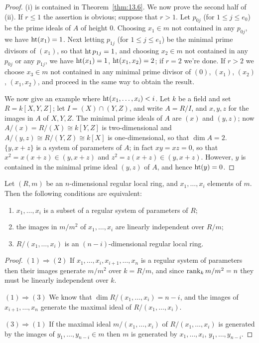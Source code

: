 \begin{proof}
(i) is contained in Theorem~\ref{thm:13.6}. We now prove the second half of
(ii). If $r \le 1$ the assertion is obvious; suppose that $r > 1$. Let $p_{0j}$ (for $1 \le
j \le e_0$) be the prime ideals of $A$ of height $0$. Choosing $x_1 \in m$ not contained
in any $p_{0j}$, we have $\operatorname{ht} (x_1) = 1$. Next letting $p_{1j}$ (for $1 \le j \le e_1$) be the minimal
prime divisors of $(x_1)$, so that $\operatorname{ht} p_{1j} = 1$, and choosing $x_2 \in m$ not contained
in any $p_{0j}$ or any $p_{1j}$, we have $\operatorname{ht}(x_1) = 1$, $\operatorname{ht}(x_1, x_2) = 2$; if $r = 2$ we're
done. If $r > 2$ we choose $x_3 \in m$ not contained in any minimal prime
divisor of $(0)$, $(x_1)$, $(x_2)$, $(x_1, x_2)$, and proceed in the same way to obtain
the result.

We now give an example where $\operatorname{ht} (x_1, \ldots, x_i) < i$. Let $k$ be a field and
set $R = k[X, Y, Z]$; let $I = (X) \cap (Y, Z)$, and write $A = R/I$, and $x, y, z$ for
the images in $A$ of $X, Y, Z$. The minimal prime ideals of $A$ are $(x)$ and
$(y, z)$; now $A/(x) = R/(X) \cong k[Y, Z]$ is two-dimensional and $A/(y, z) \cong
R/(Y, Z) \cong k[X]$ is one-dimensional, so that $\dim A = 2$. $\{y, x + z\}$ is a
system of parameters of $A$; in fact $xy = xz = 0$, so that $x^2 = x(x + z) \in
(y, x + z)$ and $z^2 = z(x + z) \in (y, x + z)$. However, $y$ is contained in the
minimal prime ideal $(y, z)$ of $A$, and hence $\operatorname{ht} (y) = 0$.
\end{proof}

\begin{theorem}\label{thm:14.2}
Let $(R, m)$ be an $n$-dimensional regular local ring, and
$x_1, \ldots, x_i$ elements of $m$. Then the following conditions are equivalent:
\begin{enumerate}[(1)]
  \item $x_1, \ldots, x_i$ is a subset of a regular system of parameters of $R$;
  \item the images in $m/m^2$ of $x_1, \ldots, x_i$ are linearly independent over $R/m$;
  \item $R/(x_1, \ldots, x_i)$ is an $(n - i)$-dimensional regular local ring.
\end{enumerate}
\end{theorem}

\begin{proof}
$(1) \Rightarrow (2)$ If $x_1, \ldots, x_i, x_{i+1}, \ldots, x_n$ is a regular system of parameters then
their images generate $m/m^2$ over $k = R/m$, and since $\operatorname{rank}_k m/m^2 = n$ they
must be linearly independent over $k$.

$(1) \Rightarrow (3)$ We know that $\dim R/(x_1, \ldots, x_i) = n - i$, and the images of
$x_{i+1}, \ldots, x_n$ generate the maximal ideal of $R/(x_1, \ldots, x_i)$.

$(3) \Rightarrow (1)$ If the maximal ideal $m/(x_1, \ldots, x_i)$ of $R/(x_1, \ldots, x_i)$ is generated
by the images of $y_1, \ldots, y_{n-i} \in m$ then $m$ is generated by $x_1, \ldots, x_i$,
$y_1, \ldots, y_{n-i}$.
\end{proof}

